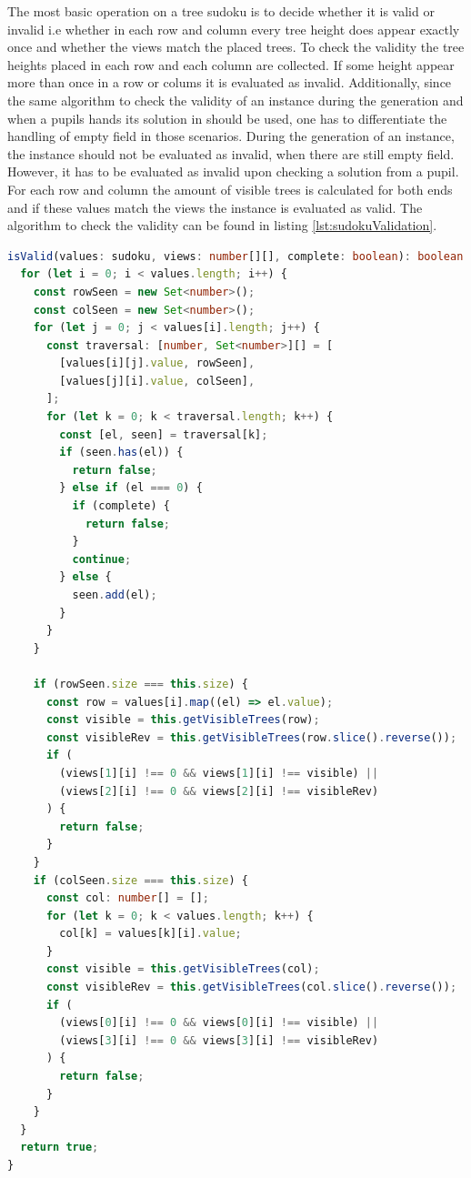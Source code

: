 The most basic operation on a tree sudoku is to decide whether it is valid or invalid i.e whether in each row and column every tree height does appear exactly once and whether the views match the placed trees.
To check the validity the tree heights placed in each row and each column are collected. If some height appear more than once in a row or colums it is evaluated as invalid. Additionally, since the same algorithm to check the validity of an instance during the generation and when a pupils hands its solution in should be used, one has to differentiate the handling of empty field in those scenarios. During the generation of an instance, the instance should not be evaluated as invalid, when there are still empty field. However, it has to be evaluated as invalid upon checking a solution from a pupil. 
For each row and column the amount of visible trees is calculated for both ends and if these values match the views the instance is evaluated as valid. The algorithm to check the validity can be found in listing \ref{lst:sudokuValidation}.

\begin{lstlisting}[language=TypeScript,caption={Validation algorithm for a tree sudoku instance},label={lst:sudokuValidation}]
isValid(values: sudoku, views: number[][], complete: boolean): boolean {
  for (let i = 0; i < values.length; i++) {
    const rowSeen = new Set<number>();
    const colSeen = new Set<number>();
    for (let j = 0; j < values[i].length; j++) {
      const traversal: [number, Set<number>][] = [
        [values[i][j].value, rowSeen],
        [values[j][i].value, colSeen],
      ];
      for (let k = 0; k < traversal.length; k++) {
        const [el, seen] = traversal[k];
        if (seen.has(el)) {
          return false;
        } else if (el === 0) {
          if (complete) {
            return false;
          }
          continue;
        } else {
          seen.add(el);
        }
      }
    }

    if (rowSeen.size === this.size) {
      const row = values[i].map((el) => el.value);
      const visible = this.getVisibleTrees(row);
      const visibleRev = this.getVisibleTrees(row.slice().reverse());
      if (
        (views[1][i] !== 0 && views[1][i] !== visible) ||
        (views[2][i] !== 0 && views[2][i] !== visibleRev)
      ) {
        return false;
      }
    }
    if (colSeen.size === this.size) {
      const col: number[] = [];
      for (let k = 0; k < values.length; k++) {
        col[k] = values[k][i].value;
      }
      const visible = this.getVisibleTrees(col);
      const visibleRev = this.getVisibleTrees(col.slice().reverse());
      if (
        (views[0][i] !== 0 && views[0][i] !== visible) ||
        (views[3][i] !== 0 && views[3][i] !== visibleRev)
      ) {
        return false;
      }
    }
  }
  return true;
}
\end{lstlisting}

